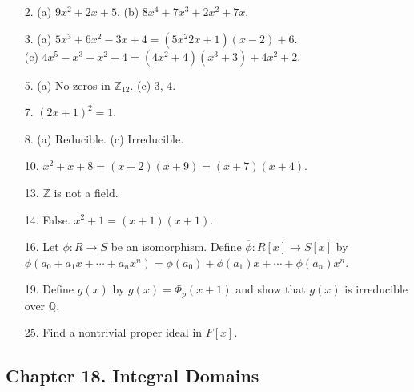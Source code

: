{\small
\begin{itemize}
 
\item[2.]
(a) $9 x^2 + 2 x + 5$.
(b) $8 x^4 + 7 x^3 + 2 x^2 + 7 x$.
 
\item[3.]
(a) $5 x^3 + 6 x^2 - 3 x + 4 = (5 x^2 2x + 1)(x -2) + 6$. \\
(c) $4x^5 - x^3 + x^2 + 4 = (4x^2 + 4)(x^3 + 3) + 4x^2 + 2$.
 
\item[5.]
(a) No zeros in ${\mathbb Z}_{12}$.
(c) 3, 4.
 
\item[7.]
$(2x+1)^2 = 1$.
 
 
\item[8.]
(a) Reducible.
(c) Irreducible.
 
 
\item[10.]
$x^2 + x + 8 = (x+2)(x+9) = (x+7)(x+4)$.
 
 
\item[13.]
${\mathbb Z}$ is not a field.
 
\item[14.]
False. $x^2 + 1 = (x+1)(x+1)$. 
 
\item[16.]
Let $\phi : R \rightarrow S$ be an isomorphism.  Define
$\overline{\phi} : R[x] \rightarrow S[x]$ by $\overline{\phi}(a_0 +
a_1 x + \cdots + a_n x^n) = \phi(a_0) + \phi(a_1) x + \cdots +
\phi(a_n) x^n$.
 

\item[19.]
Define $g(x)$ by  $g(x) = \Phi_p(x + 1)$ and show that $g(x)$ is
irreducible over ${\mathbb Q}$.


\item[25.]
Find a nontrivial proper ideal in $F[x]$.


\end{itemize}
}
 
\subsection*{Chapter 18. Integral Domains}
 
